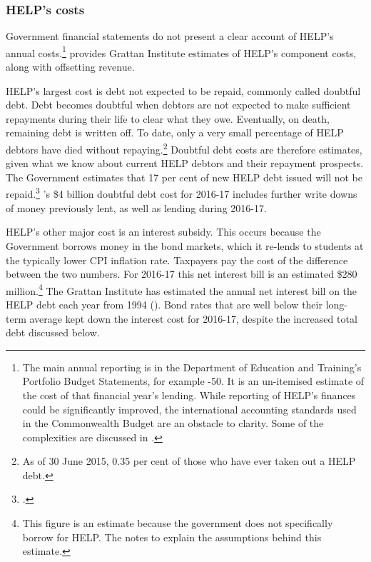 \documentclass{grattan}
\begin{document}
%
\subsubsection{HELP's costs}\label{subsubsec:helps-costs}

Government financial statements do not present a clear account of HELP's annual costs.\footnote{The main annual reporting is in the Department of Education and Training's Portfolio Budget Statements, for example \textcite[][49]{DepartmentofEducationandTraining2018portfoliobudgetst}-50. It is an un-itemised estimate of the cost of that financial year's lending. While reporting of HELP's finances could be significantly improved, the international accounting standards used in the Commonwealth Budget are an obstacle to clarity. Some of the complexities are discussed in \textcite[][]{ParliamentaryBudgetOffice2016highereducationlo}.}  provides Grattan Institute estimates of HELP's component costs, along with offsetting revenue.

HELP's largest cost is debt not expected to be repaid, commonly called doubtful debt. Debt becomes doubtful when debtors are not expected to make sufficient repayments during their life to clear what they owe. Eventually, on death, remaining debt is written off. To date, only a very small percentage of HELP debtors have died without repaying.\footnote{As of 30 June 2015, 0.35 per cent of those who have ever taken out a HELP debt.} Doubtful debt costs are therefore estimates, given what we know about current HELP debtors and their repayment prospects. The Government estimates that 17 per cent of new HELP debt issued will not be repaid.\footcite[][50]{DepartmentofEducationandTraining2018portfoliobudgetst} 's \$4 billion doubtful debt cost for 2016-17 includes further write downs of money previously lent, as well as lending during 2016-17.

HELP's other major cost is an interest subsidy. This occurs because the Government borrows money in the bond markets, which it re-lends to students at the typically lower CPI inflation rate. Taxpayers pay the cost of the difference between the two numbers. For 2016-17 this net interest bill is an estimated \$280 million.\footnote{This figure is an estimate because the government does not specifically borrow for HELP. The notes to  explain the assumptions behind this estimate.} The Grattan Institute has estimated the annual net interest bill on the HELP debt each year from 1994 (). Bond rates that are well below their long-term average kept down the interest cost for 2016-17, despite the increased total debt discussed below.
\end{document}
